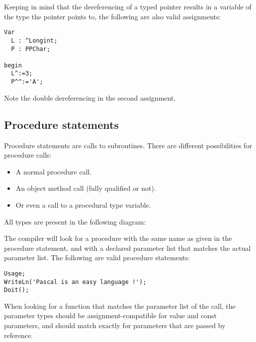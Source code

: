 Keeping in mind that the dereferencing of a typed pointer results
in a variable of the type the pointer points to, the following are
also valid assignments:
\begin{verbatim}
Var
  L : ^Longint;
  P : PPChar; 

begin
  L^:=3;
  P^^:='A';
\end{verbatim}
Note the double dereferencing in the second assignment.
\subsection{Procedure statements}
Procedure statements are calls to subroutines. There are
different possibilities for procedure calls: 
\begin{itemize}
\item A normal procedure call.
\item An object method call (fully qualified or not).
\item Or even a call to a procedural type variable.
\end{itemize} 
All types are present in the following diagram:

The \fpc compiler will look for a procedure with the same name as given in
the procedure statement, and with a declared parameter list that matches the
actual parameter list.
The following are valid procedure statements:
\begin{verbatim}
Usage;
WriteLn('Pascal is an easy language !');
Doit();
\end{verbatim}
\begin{remark}
When looking for a function that matches the parameter list of the call, 
the parameter types should be assignment-compatible for value and const
parameters, and should match exactly for parameters that are passed by
reference.
\end{remark}

